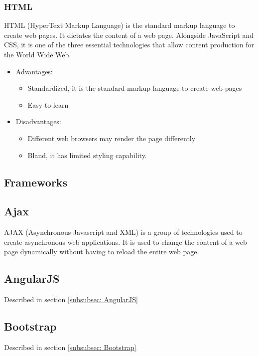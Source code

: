 \documentclass{article}
\begin{document}
			\subsubsection{HTML} %
				HTML (HyperText Markup Language) is the standard markup language to create web pages. It dictates the content of a web page. Alongside JavaScript and CSS, it is one of the three essential technologies that allow content production for the World Wide Web.
				\begin{itemize}
					\item Advantages:
						\begin{itemize}
							\item Standardized, it is the standard markup language to create web pages
							\item Easy to learn
						\end{itemize}
					\item Disadvantages:
						\begin{itemize}
							\item Different web browsers may render the page differently
							\item Bland, it has limited styling capability.
						\end{itemize}
				\end{itemize}

		
	\subsection{Frameworks}
		\subsection{Ajax}
			AJAX (Asynchronous Javascript and XML) is a group of technologies used to create asynchronous web applications. It is used to change the content of a web page dynamically without having to reload the entire web page
			
		\subsection{AngularJS}
			Described in section \ref{subsubsec: AngularJS}
			
		\subsection{Bootstrap}
			Described in section \ref{subsubsec: Bootstrap}
			
\end{document}
